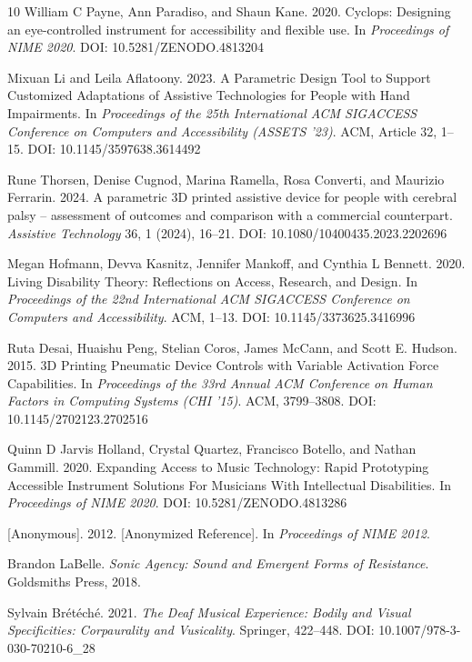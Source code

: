 \documentclass[manuscript,screen,review,anonymous]{acmart}
\begin{document}
\begin{thebibliography}{10}
William C Payne, Ann Paradiso, and Shaun Kane. 2020.
Cyclops: Designing an eye-controlled instrument for accessibility and flexible use.
In \textit{Proceedings of NIME 2020}.
DOI: 10.5281/ZENODO.4813204

Mixuan Li and Leila Aflatoony. 2023.
A Parametric Design Tool to Support Customized Adaptations of Assistive Technologies for People with Hand Impairments.
In \textit{Proceedings of the 25th International ACM SIGACCESS Conference on Computers and Accessibility (ASSETS '23)}.
ACM, Article 32, 1--15.
DOI: 10.1145/3597638.3614492

Rune Thorsen, Denise Cugnod, Marina Ramella, Rosa Converti, and Maurizio Ferrarin. 2024.
A parametric 3D printed assistive device for people with cerebral palsy -- assessment of outcomes and comparison with a commercial counterpart.
\textit{Assistive Technology} 36, 1 (2024), 16--21.
DOI: 10.1080/10400435.2023.2202696

Megan Hofmann, Devva Kasnitz, Jennifer Mankoff, and Cynthia L Bennett. 2020.
Living Disability Theory: Reflections on Access, Research, and Design.
In \textit{Proceedings of the 22nd International ACM SIGACCESS Conference on Computers and Accessibility}.
ACM, 1--13.
DOI: 10.1145/3373625.3416996

Ruta Desai, Huaishu Peng, Stelian Coros, James McCann, and Scott E. Hudson. 2015.
3D Printing Pneumatic Device Controls with Variable Activation Force Capabilities.
In \textit{Proceedings of the 33rd Annual ACM Conference on Human Factors in Computing Systems (CHI '15)}.
ACM, 3799--3808.
DOI: 10.1145/2702123.2702516

Quinn D Jarvis Holland, Crystal Quartez, Francisco Botello, and Nathan Gammill. 2020.
Expanding Access to Music Technology: Rapid Prototyping Accessible Instrument Solutions For Musicians With Intellectual Disabilities.
In \textit{Proceedings of NIME 2020}.
DOI: 10.5281/ZENODO.4813286

[Anonymous]. 2012.
[Anonymized Reference].
In \textit{Proceedings of NIME 2012}.

Brandon LaBelle.
\textit{Sonic Agency: Sound and Emergent Forms of Resistance}.
Goldsmiths Press, 2018.

Sylvain Br\'{e}t\'{e}ch\'{e}. 2021.
\textit{The Deaf Musical Experience: Bodily and Visual Specificities: Corpaurality and Vusicality}.
Springer, 422--448.
DOI: 10.1007/978-3-030-70210-6\_28



\end{thebibliography}
\end{document}
